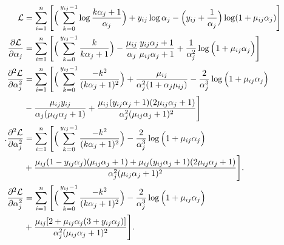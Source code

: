 \documentclass[12pt]{article}
\newcommand{\bbL}{\mathcal{L}}
\begin{document}
\begin{align*}
\bbL &= \sum_{i = 1}^n\Bigg[\Big( \sum_{k = 0}^{y_{ij} - 1}\log \frac{k\alpha_j + 1}{\alpha_j}\Big) + y_{ij}\log{\alpha_j} - \Big(y_{ij} + \frac{1}{\alpha_j} \Big) \log(1 + \mu_{ij} \alpha_j )\Bigg] \\
\frac{\partial\bbL }{\partial \alpha_j}  &= \sum_{i = 1}^n\Bigg[\Big( \sum_{k = 0}^{y_{ij} - 1}\frac{k}{k\alpha_j + 1} \Big) -\frac{\mu_{ij}}{\alpha_j} \frac{y_{ij}\alpha_j + 1}{\mu_{ij}\alpha_j + 1} +\frac{1}{\alpha_j^2} \log\Big(1 + \mu_{ij}\alpha_j \Big)\Bigg] \\
\frac{\partial^2\bbL }{\partial \alpha_j^2}  &= \sum_{i = 1}^n\Bigg[\Big( \sum_{k = 0}^{y_{ij} - 1} \frac{-k^2}{(k\alpha_j + 1)^2} \Big)  + \frac{\mu_{ij}}{\alpha_j^2(1+\alpha_j\mu_{ij})} -\frac{2}{\alpha_j^3} \log\Big(1 + \mu_{ij}\alpha_j \Big) \notag  \\
&-\frac{\mu_{ij}y_{ij}}{\alpha_j(\mu_{ij}\alpha_j + 1)} + \frac{\mu_{ij}(y_{ij}\alpha_j + 1)(2\mu_{ij}\alpha_j + 1)}{\alpha_j^2(\mu_{ij}\alpha_j + 1)^2}  \Bigg] \\.
\frac{\partial^2\bbL }{\partial \alpha_j^2}  &= \sum_{i = 1}^n\Bigg[\Big( \sum_{k = 0}^{y_{ij} - 1} \frac{-k^2}{(k\alpha_j + 1)^2} \Big)  -\frac{2}{\alpha_j^3} \log\Big(1 + \mu_{ij}\alpha_j \Big) %
\notag  \\
& + \frac{\mu_{ij}(1-y_{ij}\alpha_j) (\mu_{ij}\alpha_j + 1)  + \mu_{ij}(y_{ij}\alpha_j + 1)(2\mu_{ij}\alpha_j + 1)}{\alpha_j^2(\mu_{ij}\alpha_j + 1)^2}  \Bigg]. \\
\frac{\partial^2\bbL }{\partial \alpha_j^2}  &= \sum_{i = 1}^n\Bigg[\Big( \sum_{k = 0}^{y_{ij} - 1} \frac{-k^2}{(k\alpha_j + 1)^2} \Big)  -\frac{2}{\alpha_j^3} \log\Big(1 + \mu_{ij}\alpha_j \Big) %
\notag  \\
& + \frac{\mu_{ij}[2 +\mu_{ij}\alpha_j (3+y_{ij}\alpha_j) ]}{\alpha_j^2(\mu_{ij}\alpha_j + 1)^2}  \Bigg]. 
\end{align*}
\end{document}
